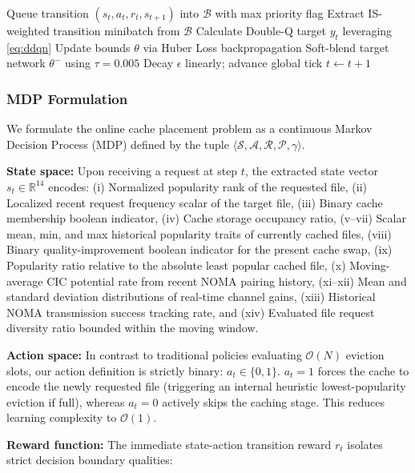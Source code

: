 \documentclass[12pt,a4paper]{article}
\begin{document}
\begin{algorithm}
\begin{algorithmic}[1]
        \STATE Queue transition $(s_t, a_t, r_t, s_{t+1})$ into $\mathcal{B}$ with max priority flag
            \STATE Extract IS-weighted transition minibatch from $\mathcal{B}$
            \STATE Calculate Double-Q target $y_t$ leveraging \eqref{eq:ddqn}
            \STATE Update bounds $\theta$ via Huber Loss backpropagation
            \STATE Soft-blend target network $\theta^-$ using $\tau = 0.005$
        \ENDIF
        \STATE Decay $\epsilon$ linearly; advance global tick $t \leftarrow t + 1$
    \ENDFOR
\ENDFOR
\end{algorithmic}
\end{algorithm}

\subsubsection{MDP Formulation}
We formulate the online cache placement problem as a continuous Markov Decision Process (MDP) defined by the tuple $\langle \mathcal{S}, \mathcal{A}, \mathcal{R}, \mathcal{P}, \gamma \rangle$.

\textbf{State space:} Upon receiving a request at step $t$, the extracted state vector $s_t \in \mathbb{R}^{14}$ encodes:
(i) Normalized popularity rank of the requested file,
(ii) Localized recent request frequency scalar of the target file,
(iii) Binary cache membership boolean indicator,
(iv) Cache storage occupancy ratio,
(v--vii) Scalar mean, min, and max historical popularity traits of currently cached files,
(viii) Binary quality-improvement boolean indicator for the present cache swap,
(ix) Popularity ratio relative to the absolute least popular cached file,
(x) Moving-average CIC potential rate from recent NOMA pairing history,
(xi--xii) Mean and standard deviation distributions of real-time channel gains,
(xiii) Historical NOMA transmission success tracking rate, and
(xiv) Evaluated file request diversity ratio bounded within the moving window.

\textbf{Action space:} In contrast to traditional policies evaluating $\mathcal{O}(N)$ eviction slots, our action definition is strictly binary: $a_t \in \{0, 1\}$. $a_t = 1$ forces the cache to encode the newly requested file (triggering an internal heuristic lowest-popularity eviction if full), whereas $a_t = 0$ actively skips the caching stage. This reduces learning complexity to $\mathcal{O}(1)$.

\textbf{Reward function:} The immediate state-action transition reward $r_t$ isolates strict decision boundary qualities:
\end{document}
